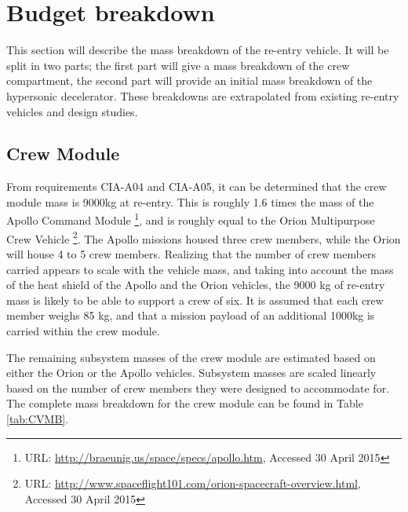 \section{Budget breakdown} \label{ch:budget}
This section will describe the mass breakdown of the re-entry vehicle. It will be split in two parts; the first part will give a mass breakdown of the crew compartment, the second part will provide an initial mass breakdown of the hypersonic decelerator. These breakdowns are extrapolated from existing re-entry vehicles and design studies.

\subsection{Crew Module}
From requirements CIA-A04 and CIA-A05, it can be determined that the crew module mass is 9000kg at re-entry. This is roughly 1.6 times the mass of the Apollo Command Module \footnote{URL: \url{http://braeunig.us/space/specs/apollo.htm}, Accessed 30 April 2015}, and is roughly equal to the Orion Multipurpose Crew Vehicle \footnote{URL: \url{http://www.spaceflight101.com/orion-spacecraft-overview.html}, Accessed 30 April 2015}. The Apollo missions housed three crew members, while the Orion will house 4 to 5 crew members. Realizing that the number of crew members carried appears to scale with the vehicle mass, and taking into account the mass of the heat shield of the Apollo and the Orion vehicles, the 9000 kg of re-entry mass is likely to be able to support a crew of six. It is assumed that each crew member weighs 85 kg, and that a mission payload of an additional 1000kg is carried within the crew module. 

The remaining subsystem masses of the crew module are estimated based on either the Orion or the Apollo vehicles. Subsystem masses are scaled linearly based on the number of crew members they were designed to accommodate for. The complete mass breakdown for the crew module can be found in Table \ref{tab:CVMB}.

